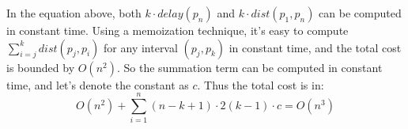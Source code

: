 In the equation above, both $k \cdot delay(p_n)$ and $k \cdot dist(p_1, p_n)$ can be computed in constant time. Using a memoization technique, it's easy to compute $\sum_{i=j}^{k}dist(p_j, p_i)$ for any interval $(p_j, p_k)$ in constant time, and the total cost is bounded by $O(n^2)$. So the summation term can be computed in constant time, and let's denote the constant as $c$. Thus the total cost is in:
\[
  O(n^2) + \sum_{i=1}^{n} (n - k + 1) \cdot 2(k - 1) \cdot c = O(n^3)
\]

